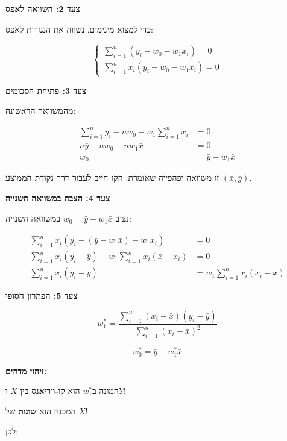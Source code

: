 \textbf{צעד \num{2}: השוואה לאפס}

כדי למצוא מינימום, נשווה את הנגזרות לאפס:

\begin{equation}
\begin{cases}
\sum_{i=1}^{n} (y_i - w_0 - w_1 x_i) = 0 \\
\sum_{i=1}^{n} x_i(y_i - w_0 - w_1 x_i) = 0
\end{cases}
\end{equation}

\textbf{צעד \num{3}: פתיחת הסכומים}

מהמשוואה הראשונה:

\begin{align}
\sum_{i=1}^{n} y_i - n w_0 - w_1 \sum_{i=1}^{n} x_i &= 0 \nonumber \\
n \bar{y} - n w_0 - n w_1 \bar{x} &= 0 \nonumber \\
w_0 &= \bar{y} - w_1 \bar{x}
\end{align}

זו משוואה יפהפייה שאומרת: \textbf{הקו חייב לעבור דרך נקודת הממוצע} $(\bar{x}, \bar{y})$.

\textbf{צעד \num{4}: הצבה במשוואה השנייה}

נציב $w_0 = \bar{y} - w_1 \bar{x}$ במשוואה השנייה:

\begin{align}
\sum_{i=1}^{n} x_i(y_i - (\bar{y} - w_1 \bar{x}) - w_1 x_i) &= 0 \nonumber \\
\sum_{i=1}^{n} x_i(y_i - \bar{y}) - w_1 \sum_{i=1}^{n} x_i(\bar{x} - x_i) &= 0 \nonumber \\
\sum_{i=1}^{n} x_i(y_i - \bar{y}) &= w_1 \sum_{i=1}^{n} x_i(x_i - \bar{x})
\end{align}

\textbf{צעד \num{5}: הפתרון הסופי}

\begin{equation}
w_1^* = \frac{\sum_{i=1}^{n} (x_i - \bar{x})(y_i - \bar{y})}{\sum_{i=1}^{n} (x_i - \bar{x})^2}
\end{equation}

\begin{equation}
w_0^* = \bar{y} - w_1^* \bar{x}
\end{equation}

\textbf{זיהוי מדהים:}

המונה ב\en{-}$w_1^*$ הוא \textbf{קו-ווריאנס} בין $X$ ו\en{-}$Y$!

המכנה הוא \textbf{שונות} של $X$!

לכן:


